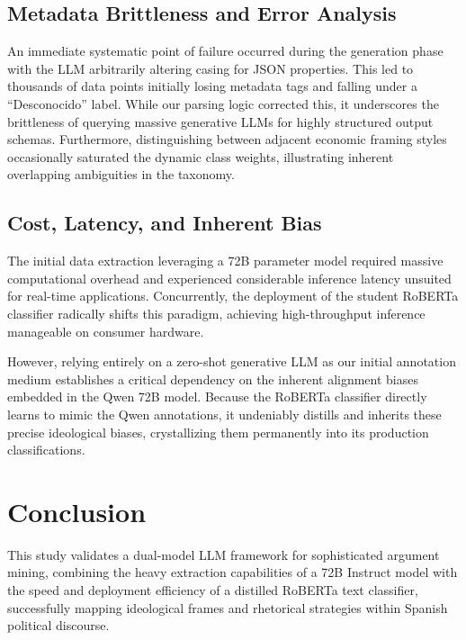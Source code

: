 \documentclass[11pt,a4paper]{article}
\begin{document}
\subsection{Metadata Brittleness and Error Analysis}
An immediate systematic point of failure occurred during the generation phase with the LLM arbitrarily altering casing for JSON properties. This led to thousands of data points initially losing metadata tags and falling under a ``Desconocido'' label. While our parsing logic corrected this, it underscores the brittleness of querying massive generative LLMs for highly structured output schemas. Furthermore, distinguishing between adjacent economic framing styles occasionally saturated the dynamic class weights, illustrating inherent overlapping ambiguities in the taxonomy.

\subsection{Cost, Latency, and Inherent Bias}
The initial data extraction leveraging a 72B parameter model required massive computational overhead and experienced considerable inference latency unsuited for real-time applications. Concurrently, the deployment of the student RoBERTa classifier radically shifts this paradigm, achieving high-throughput inference manageable on consumer hardware.

However, relying entirely on a zero-shot generative LLM as our initial annotation medium establishes a critical dependency on the inherent alignment biases embedded in the Qwen 72B model. Because the RoBERTa classifier directly learns to mimic the Qwen annotations, it undeniably distills and inherits these precise ideological biases, crystallizing them permanently into its production classifications.

\section{Conclusion}
This study validates a dual-model LLM framework for sophisticated argument mining, combining the heavy extraction capabilities of a 72B Instruct model with the speed and deployment efficiency of a distilled RoBERTa text classifier, successfully mapping ideological frames and rhetorical strategies within Spanish political discourse.
\end{document}
